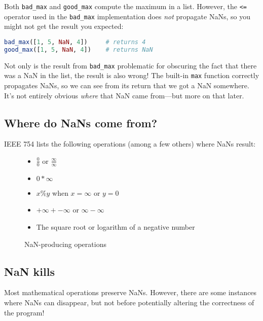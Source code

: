 \documentclass{juliacon}
\begin{document}
Both \texttt{bad\_max} and \texttt{good\_max} compute the maximum in a list.
However, the \texttt{<=} operator used in the \texttt{bad\_max} implementation does \emph{not} propagate NaNs, so you might not get the result you expected:

\begin{lstlisting}[language = Julia]
bad_max([1, 5, NaN, 4])     # returns 4
good_max([1, 5, NaN, 4])    # returns NaN
\end{lstlisting}

Not only is the result from \texttt{bad\_max} problematic for obscuring the fact that there was a NaN in the list, the result is also wrong!
The built-in \texttt{max} function correctly propagates NaNs, so we can see from its return that we got a NaN somewhere.
It's not entirely obvious \emph{where} that NaN came from---but more on that later.   %

\subsection{Where do NaNs come from?}

IEEE 754 \cite{IEEEStandardBinary1985} lists the following operations (among a few others) where NaNs result:

\begin{figure}[h]
  \label{fig:nan-gens}
  \begin{itemize}
  \item $\frac{0}{0}$ or $\frac{\infty}{\infty}$
  \item $0 * \infty$
  \item $x \% y$ when $x = \infty$ or $y = 0$
  \item $+\infty + -\infty$ or $\infty - \infty$
  \item The square root or logarithm of a negative number
  \end{itemize}
  \caption{NaN-producing operations}
\end{figure}


\subsection{NaN kills}

Most mathematical operations preserve NaNs.
However, there are some instances where NaNs can disappear, but not before potentially altering the correctness of the program!
\end{document}
